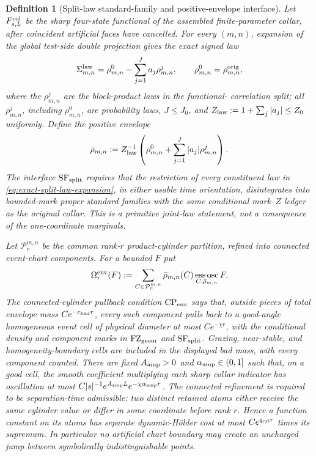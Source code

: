 \documentclass[11pt]{article}
\newtheorem{definition}[theorem]{Definition}
\begin{document}
\begin{definition}[Split-law standard-family and positive-envelope interface]
\label{def:split-law-envelope}
Let $F_{s,L}^{\rm col}$ be the sharp four-state functional of the assembled
finite-parameter collar, after coincident artificial faces have cancelled.
For every $(m,n)$, expansion of the global test-side double projection gives
the exact signed law
\begin{equation}
\label{eq:exact-split-law-expansion}
 \Sigma_{m,n}^{\rm law}
 =\rho_{m,n}^{0}-\sum_{j=1}^{J}a_j\rho_{m,n}^{j},
 \qquad \rho_{m,n}^{0}=\rho_{m,n}^{\rm orig},
\end{equation}
where the $\rho_{m,n}^{j}$ are the block-product laws in the functional-
correlation split; all $\rho_{m,n}^{j}$, including $\rho_{m,n}^{0}$, are
probability laws, $J\le J_0$, and
$Z_{\rm law}:=1+\sum_j|a_j|\le Z_0$ uniformly.  Define the positive envelope
\begin{equation}
\label{eq:positive-envelope-law}
 \bar\rho_{m,n}:=Z_{\rm law}^{-1}
 \left(\rho_{m,n}^{0}+\sum_{j=1}^{J}|a_j|\rho_{m,n}^{j}\right).
\end{equation}
The interface $\mathrm{SF}_{\rm split}$ requires that the restriction of every
constituent law in \eqref{eq:exact-split-law-expansion}, in either usable time
orientation, disintegrates into bounded-mark proper standard families with the
same conditional mark--$Z$ ledger as the original collar.  This is a primitive
joint-law statement, not a consequence of the one-coordinate marginals.

Let $\mathcal P_r^{m,n}$ be the common rank-$r$ product-cylinder partition,
refined into connected event-chart components.  For a bounded $F$ put
\begin{equation}
\label{eq:envelope-cylinder-oscillation}
 \Omega_r^{\rm env}(F):=
 \sum_{C\in\mathcal P_r^{m,n}}\bar\rho_{m,n}(C)
 \operatorname*{ess\,osc}_{C,\bar\rho_{m,n}}F.
\end{equation}
The connected-cylinder pullback condition $\mathrm{CP}_{\rm env}$ says that,
outside pieces of total envelope mass $Ce^{-c_{\rm bad}r}$, every such
component pulls back to a good-angle homogeneous event cell of physical
diameter at most $Ce^{-\chi r}$, with the conditional density and component
marks in $\mathrm{FZ}_{\rm geom}$ and $\mathrm{SF}_{\rm split}$.  Grazing,
near-stable, and homogeneity-boundary cells are included in the displayed bad
mass, with every component counted.
There are fixed $A_{\rm amp}>0$ and $\alpha_{\rm amp}\in(0,1]$ such that, on
a good cell, the smooth coefficient multiplying each sharp collar indicator
has oscillation at most
$C|s|^{-1}e^{A_{\rm amp}L}e^{-\chi\alpha_{\rm amp}r}$.
The connected refinement is required to be separation-time admissible: two
distinct retained atoms either receive the same cylinder value or differ in
some coordinate before rank $r$.  Hence a function constant on its atoms has
separate dynamic-H\"older cost at most $Ce^{q_{\rm cyl}r}$ times its
supremum.  In particular no artificial chart boundary may create an
uncharged jump between symbolically indistinguishable points.
\end{definition}
\end{document}
